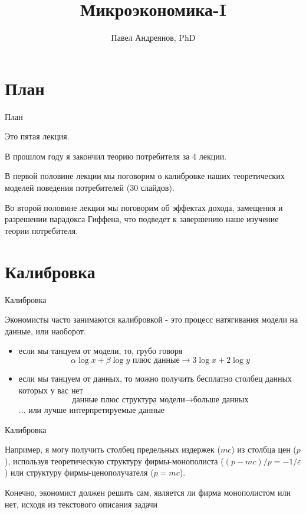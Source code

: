 \documentclass{beamer}
\title{
Микроэкономика-I
}
\author{
Павел Андреянов, PhD
}
\begin{document}
\maketitle

\section{План}

\begin{frame}{План}

Это пятая лекция.

В прошлом году я закончил теорию потребителя за 4 лекции.

В первой половине лекции мы поговорим о калибровке наших теоретических моделей поведения потребителей (30 слайдов).

Во второй половине лекции мы поговорим об эффектах дохода, замещения и разрешении парадокса Гиффена, что подведет к завершению наше изучение теории потребителя.

\end{frame}

\section{Калибровка}

\begin{frame}{Калибровка}

Экономисты часто занимаются \alert{калибровкой} - это процесс натягивания модели на данные, или наоборот. 

\begin{itemize}
  \item если мы танцуем от модели, то, грубо говоря $$ \alpha \log x + \beta \log y \text{ плюс данные} \to 3 \log x + 2 \log y$$
  \item если мы танцуем от данных, то можно получить бесплатно столбец данных которых у вас нет
  $$ \text{данные плюс структура модели} \to \text{больше данных}$$
... или лучше интерпретируемые данные
\end{itemize}

\end{frame}

\begin{frame}{Калибровка}

Например, я могу получить столбец предельных издержек ($mc$) из столбца цен ($p$), используя теоретическую структуру фирмы-монополиста ($(p - mc)/p = -1/\varepsilon$) или структуру фирмы-ценополучателя ($p = mc$).

Конечно, экономист должен решить сам, является ли фирма монополистом или нет, исходя из текстового описания задачи

\end{frame}
\end{document}
